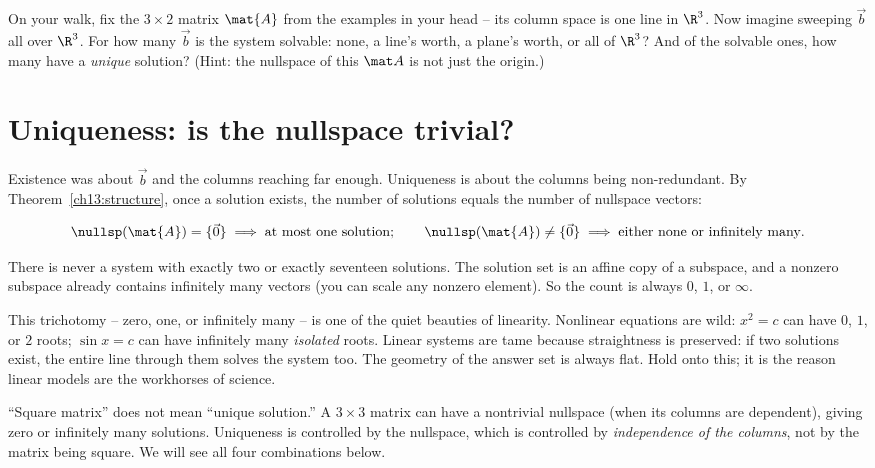 \begin{walkbox}
On your walk, fix the $3\times2$ matrix $\mat{A}$ from the examples in your head -- its
column space is one line in $\R^3$. Now imagine sweeping $\vec{b}$ all over $\R^3$. For how
many $\vec{b}$ is the system solvable: none, a line's worth, a plane's worth, or all of
$\R^3$? And of the solvable ones, how many have a \emph{unique} solution? (Hint: the
nullspace of this $\mat A$ is not just the origin.)
\end{walkbox}

\section{Uniqueness: is the nullspace trivial?}

Existence was about $\vec{b}$ and the columns reaching far enough. Uniqueness is about the
columns being non-redundant. By Theorem~\ref{ch13:structure}, once a solution exists, the
number of solutions equals the number of nullspace vectors:

\[
  \nullsp(\mat{A})=\{\vec{0}\}\;\Longrightarrow\;\text{at most one solution};\qquad
  \nullsp(\mat{A})\neq\{\vec{0}\}\;\Longrightarrow\;\text{either none or infinitely many}.
\]

There is never a system with exactly two or exactly seventeen solutions. The solution set
is an affine copy of a subspace, and a nonzero subspace already contains infinitely many
vectors (you can scale any nonzero element). So the count is always $0$, $1$, or $\infty$.

\begin{aestheticbox}
This trichotomy -- zero, one, or infinitely many -- is one of the quiet beauties of
linearity. Nonlinear equations are wild: $x^2=c$ can have $0$, $1$, or $2$ roots; $\sin
x=c$ can have infinitely many \emph{isolated} roots. Linear systems are tame because
straightness is preserved: if two solutions exist, the entire line through them solves the
system too. The geometry of the answer set is always flat. Hold onto this; it is the reason
linear models are the workhorses of science.
\end{aestheticbox}

\begin{trapbox}
``Square matrix'' does not mean ``unique solution.'' A $3\times3$ matrix can have a
nontrivial nullspace (when its columns are dependent), giving zero or infinitely many
solutions. Uniqueness is controlled by the nullspace, which is controlled by
\emph{independence of the columns}, not by the matrix being square. We will see all four
combinations below.
\end{trapbox}

